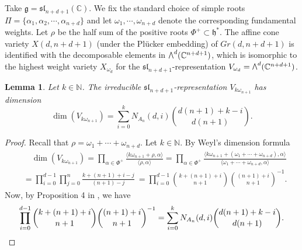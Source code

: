 \documentclass[12pt]{extarticle}
\theoremstyle{plain}
\newtheorem{lemm}[theo]{Lemma}
\theoremstyle{definition}
\theoremstyle{remark}
\newcommand{\Wedge}{\scalebox{0.8}{\raisebox{0.4ex}{$\bigwedge$}}}
\newcommand{\slnnd}{\mathfrak{sl}_{n+d+1}}
\newcommand{\Lieg}{\mathfrak{g}}
\newcommand{\Lieh}{\mathfrak{h}}
\newcommand{\N}{\mathbb{N}}
\newcommand{\C}{\mathbb{C}}
\begin{document}
Take $\Lieg=\slnnd(\C)$. We fix the standard choice of simple roots $\Pi=\{\alpha_1,\alpha_2,\cdots,\alpha_{n+d}\}$ and let $\omega_1,\cdots,\omega_{n+d}$ denote the corresponding fundamental weights.
Let $\rho$ be the half sum of the positive roots $\Phi^+\subset\Lieh^*$. 
The affine cone variety $X(d,n+d+1)$ (under the Pl\"ucker embedding) of $Gr(d,n+d+1)$ is identified with the decomposable elements in $\Wedge^d(\C^{n+d+1})$, which is isomorphic to the highest weight variety $X_{\omega_d}$ for the $\slnnd$-representation $V_{\omega_d}=\Wedge^d(\C^{n+d+1})$.

\begin{lemm}\label{dimrep3}
    Let $k\in\N$. The irreducible $\slnnd$-representation $V_{k\omega_{n+1}}$ has dimension
    $$\dim(V_{k\omega_{n+1}})=\displaystyle\sum_{i=0}^{k}N_{A_n}(d,i)\binom{d(n+1)+k-i}{d(n+1)}.$$
\end{lemm}
\begin{proof}
Recall that $\rho=\omega_1+\cdots+\omega_{n+d}$. Let $k\in\N$. By Weyl's dimension formula
\begin{align}\label{Vkomega}
   &\quad \dim(V_{k\omega_{n+1}}) =\prod_{\alpha\in\Phi^+}\frac{\langle k\omega_{n+1} +\rho,\alpha\rangle}{\langle\rho,\alpha\rangle}
   =\prod_{\alpha\in\Phi^+}\frac{\langle k\omega_{n+1}+(\omega_1+\cdots+\omega_{n+d}),\alpha\rangle}{\langle\omega_1+\cdots+\omega_{n+d},\alpha\rangle}\nonumber\\
   & =\prod_{i=0}^{d-1}\prod_{j=0}^{n}\frac{k+(n+1)+i-j}{(n+1)-j}\
   =\prod_{i=0}^{d-1}\binom{k+(n+1)+i}{n+1}\binom{(n+1)+i}{n+1}^{-1}.
\end{align}
Now, by Proposition 4 in \cite{Sulanke}, we have
\[
    \prod_{i=0}^{d-1}\binom{k+(n+1)+i}{n+1}\binom{(n+1)+i}{n+1}^{-1}=\sum_{i=0}^{k}N_{A_n}(d,i)\binom{d(n+1)+k-i}{d(n+1)}.\qedhere
\]

\end{proof}
\end{document}
